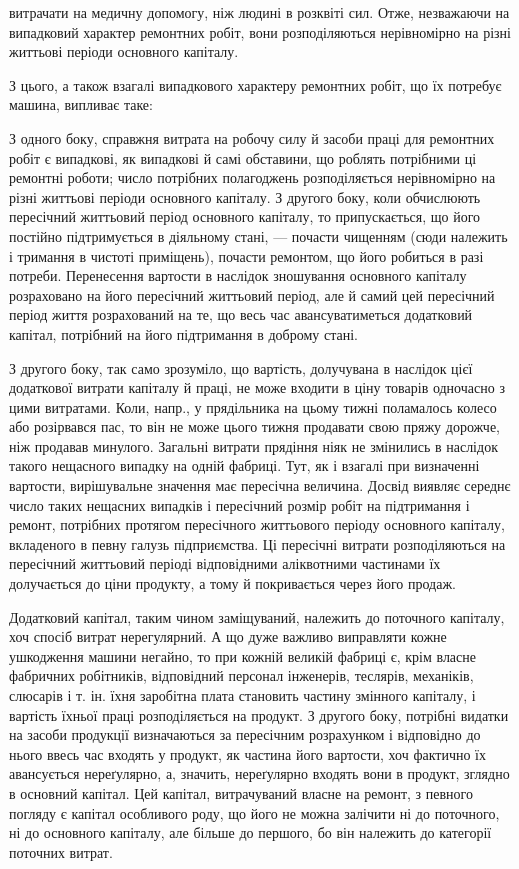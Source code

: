 \parcont{}  %
витрачати на медичну допомогу, ніж людині в розквіті сил. Отже, незважаючи на випадковий характер
ремонтних робіт, вони розподіляються нерівномірно на різні життьові періоди основного капіталу.

З цього, а також взагалі випадкового характеру ремонтних робіт, що їх потребує машина, випливає
таке:

З одного боку, справжня витрата на робочу силу й засоби праці для ремонтних робіт є випадкові, як
випадкові й самі обставини, що роблять потрібними ці ремонтні роботи; число потрібних полагоджень
розподіляється нерівномірно на різні життьові періоди основного капіталу. З другого боку, коли
обчислюють пересічний життьовий період основного капіталу, то припускається, що його постійно
підтримується в діяльному
стані, — почасти чищенням (сюди належить і тримання в чистоті приміщень), почасти ремонтом, що його
робиться в разі потреби. Перенесення вартости в наслідок зношування основного капіталу розраховано
на його пересічний життьовий період, але й самий цей пересічний період життя розрахований на те, що
весь час авансуватиметься додатковий капітал, потрібний на його підтримання в доброму стані.

З другого боку, так само зрозуміло, що вартість, долучувана в наслідок цієї додаткової витрати
капіталу й праці, не може входити в ціну товарів одночасно з цими витратами. Коли, напр., у
прядільника на цьому тижні поламалось колесо або розірвався пас, то він не може цього тижня
продавати свою пряжу дорожче, ніж продавав минулого. Загальні витрати прядіння ніяк не змінились в
наслідок такого нещасного випадку на одній фабриці. Тут, як і взагалі при визначенні вартости,
вирішувальне значення має пересічна величина. Досвід виявляє середнє число таких нещасних випадків і
пересічний розмір робіт на підтримання і ремонт, потрібних протягом пересічного життьового періоду
основного капіталу, вкладеного в певну галузь підприємства. Ці пересічні витрати розподіляються на
пересічний життьовий періоді відповідними аліквотними частинами їх долучається до ціни продукту, а
тому й покривається через його продаж.

Додатковий капітал, таким чином заміщуваний, належить до поточного капіталу, хоч спосіб витрат
нерегулярний. А що дуже важливо виправляти кожне ушкодження машини негайно, то при кожній великій
фабриці є, крім власне фабричних робітників, відповідний персонал інженерів, теслярів, механіків,
слюсарів і т. ін. їхня заробітна плата становить частину змінного капіталу, і вартість їхньої праці
розподіляється на
продукт. З другого боку, потрібні видатки на засоби продукції визначаються за пересічним розрахунком
і відповідно до нього ввесь час входять у продукт, як частина його вартости, хоч фактично їх
авансується нереґулярно, а, значить, нереґулярно входять вони в продукт, зглядно в основний капітал.
Цей капітал, витрачуваний власне на ремонт, з певного погляду є капітал особливого роду, що його не
можна залічити ні до поточного, ні до основного капіталу, але більше до першого, бо він належить до
категорії поточних витрат.

